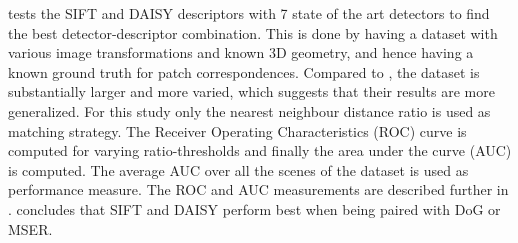\documentclass[../thesis.tex]{subfiles}
\begin{document}
\cite{dahl2011finding} tests the SIFT and DAISY descriptors with 7 state of the art detectors to find the best detector-descriptor combination. This is done by having a dataset with various image transformations and known 3D geometry, and hence having a known ground truth for patch correspondences. Compared to \cite{mikolajczyk2005performance}, the dataset is substantially larger and more varied, which suggests that their results are more generalized. For this study only the nearest neighbour distance ratio is used as matching strategy. The Receiver Operating Characteristics (ROC) curve is computed for varying ratio-thresholds and finally the area under the curve (AUC) is computed. The average AUC over all the scenes of the dataset is used as performance measure. The ROC and AUC measurements are described further in . \cite{dahl2011finding} concludes that SIFT and DAISY perform best when being paired with DoG or MSER.

\subbibliography
\end{document}
